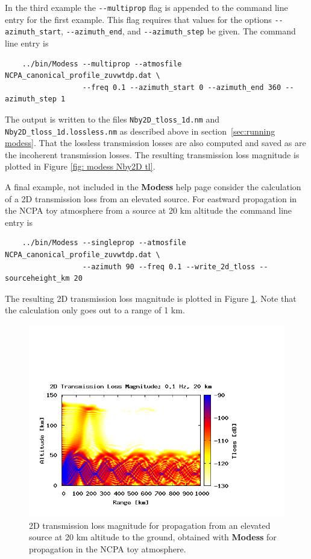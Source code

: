 In the third example the \verb+--multiprop+ flag is appended to the command line entry for the first example. This flag requires that values for the options \verb+--azimuth_start+, \verb+--azimuth_end+, and \verb+--azimuth_step+ be given. The command line entry is 
\begin{verbatim} 
    ../bin/Modess --multiprop --atmosfile NCPA_canonical_profile_zuvwtdp.dat \
                  --freq 0.1 --azimuth_start 0 --azimuth_end 360 --azimuth_step 1
\end{verbatim}
The output is written to the files \verb+Nby2D_tloss_1d.nm+ and \verb+Nby2D_tloss_1d.lossless.nm+ as described above in section~\ref{sec:running modess}. That the lossless transmission losses are also computed and saved as are the incoherent transmission losses. The resulting transmission loss magnitude is plotted in Figure \ref{fig: modess Nby2D tl}. 

A final example, not included in the \textbf{Modess} help page consider the calculation of a 2D transmission loss from an elevated source. For eastward propagation in the NCPA toy atmosphere from a source at 20 km altitude the command line entry is 
\begin{verbatim} 
    ../bin/Modess --singleprop --atmosfile NCPA_canonical_profile_zuvwtdp.dat \ 
                  --azimuth 90 --freq 0.1 --write_2d_tloss --sourceheight_km 20
\end{verbatim}
The resulting 2D transmission loss magnitude is plotted in Figure \ref{fig: modess 2D elevated source}. Note that the calculation only goes out to a range of 1 km. 

\begin{figure}
\begin{center}
\includegraphics[scale=0.45,trim = 20 20 110 140,clip]{figs/modess_ex2_20km_source}
\end{center}
\caption{2D transmission loss magnitude for propagation from an elevated source at 20 km altitude to the ground, obtained with {\bf Modess} for propagation in the NCPA toy atmosphere.}
\label{fig: modess 2D elevated source}
\end{figure}
